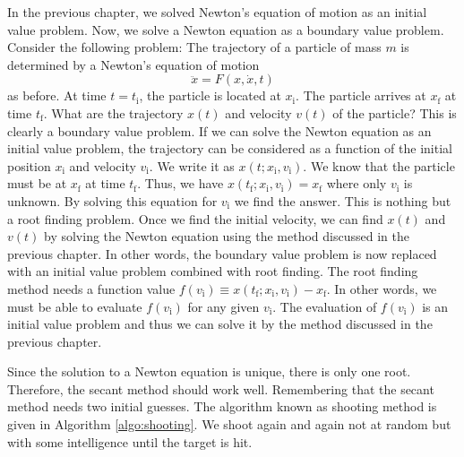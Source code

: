In the previous chapter, we solved Newton's equation of motion as an initial value problem.  Now, we solve a Newton equation as a boundary value problem.  Consider the following problem:
The trajectory of a particle of mass $m$ is determined by a Newton's equation of motion
\begin{equation}
\ddot{x} = F(x, \dot{x}, t)
\end{equation}
as before. At time $t=t_\text{i}$, the particle is located at $x_\text{i}$. The particle arrives at $x_\text{f}$ at time $t_\text{f}$.  What are the trajectory $x(t)$ and velocity $v(t)$ of the particle?  This is clearly a boundary value problem.  If we can solve the Newton equation as an initial value problem, the trajectory can be considered as a function of the initial position $x_\text{i}$ and velocity $v_\text{i}$. We write it as $x(t;x_\text{i}, v_\text{i})$.  We know that the particle must be at $x_\text{f}$ at time $t_\text{f}$. Thus, we have $x(t_\text{f}; x_\text{i}, v_\text{i}) = x_\text{f}$ where only $v_\text{i}$ is unknown. By solving this equation for $v_\text{i}$  we find the answer.  This is nothing but a root finding problem.  Once we find the initial velocity, we can find $x(t)$ and $v(t)$ by solving the Newton equation using the method discussed in the previous chapter.  In other words, the boundary value problem is now replaced with an initial value problem combined with root finding.  The root finding method needs a function value $f(v_\text{i}) \equiv  x(t_\text{f}; x_\text{i}, v_\text{i}) - x_\text{f}$.  In other words, we must be able to evaluate $f(v_\text{i})$ for any given $v_\text{i}$.  The evaluation of $f(v_\text{i})$ is an initial value problem and thus we can solve it by the method discussed in the previous chapter.

Since the solution to a Newton equation is unique, there is only one root.  Therefore, the secant method should work well.  Remembering that the secant method needs two initial guesses.  The algorithm known as shooting method is given in Algorithm \ref{algo:shooting}. We shoot again and again not at random but with some intelligence until the target is hit.


